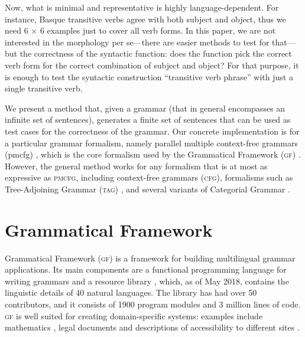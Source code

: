 \documentclass[11pt]{article}
\def\gf{\textsc{gf}}
\def\ccg{\textsc{ccg}}
\def\acg{\textsc{acg}}
\def\tag{\textsc{tag}}
\def\cfg{\textsc{cfg}}
\def\pmcfg{\textsc{pmcfg}}
\newcommand{\todo}[1]{{\color{cyan}\textbf{[TODO: }#1\textbf{]}}}
\begin{document}
Now, what is minimal and representative is highly language-dependent. 
For instance, Basque transitive verbs agree with both subject and
object, thus we need 6 $\times$ 6 examples just to cover all verb
forms. In this paper, we are not interested in the morphology per se---there are
easier methods to test for that---but the correctness of the syntactic
function: does the function pick the correct verb form for the correct
combination of subject and object? For that purpose, it is enough to
test the syntactic construction ``transitive verb phrase'' with just a
single transitive verb.

We present a method that, given a grammar (that in general encompasses an infinite set of sentences), generates a finite set of sentences that can be used as test cases for the correctness of the grammar. Our concrete implementation is for a particular grammar formalism,
namely parallel multiple context-free grammars ({\sc pmcfg})
\cite{seki91pmcfg}, which is the core formalism used by the
Grammatical Framework (\gf) \cite{ranta2004gf}. However, the general
method works for any formalism that is at most as expressive as
\pmcfg{}, including context-free grammars (\cfg), formalisms such as Tree-Adjoining Grammar (\tag)
\cite{joshi1975tag}, and several variants of Categorial Grammar
\cite{deGroote2004,steedman1988ccg}.


\section{Grammatical Framework}
\label{sec:GF}

Grammatical Framework (\gf) \cite{ranta2004gf} 
is a framework for building multilingual grammar applications. Its main
components are a functional programming language for writing grammars
and a resource library \cite{ranta2009rgl}, which, as of May 2018,
contains the linguistic details of 40 natural languages. The library
has had over 50 contributors, and it consists of 1900 program modules and 3
million lines of code. \gf{} is well suited for creating
domain-specific systems: examples include mathematics
\cite{caprotti2006webalt}, legal documents \cite{camilleri2017} and
descriptions of accessibility to different sites \cite{ranta2015grammar}.
\end{document}
